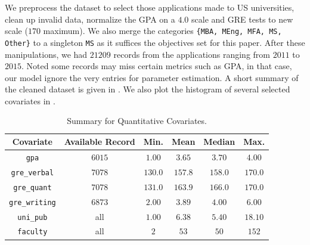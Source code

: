 \documentclass{article}
\newcommand{\var}[1]{\texttt{#1}}
\begin{document}
	We preprocess the dataset to select those applications made to US universities,
	clean up invalid data, normalize the GPA on a $4.0$ scale and GRE tests
	to new scale ($170$ maximum). We also merge the categories \var{\{MBA, MEng, MFA, MS, Other\}}
	to a singleton \var{MS} as it suffices the objectives set for this paper. After these manipulations,
	we had $21209$ records from the applications ranging from $2011$ to $2015$. Noted some records
	may miss certain metrics such as GPA, in that case, our model ignore the very entries for parameter
	estimation. A short summary of the cleaned dataset is given in . We also plot the histogram of several selected covariates in .

	\begin{table}[htpb]
	    \centering
	    \begin{tabular}{|c|c|c|c|c|c|}
		\hline
		Covariate & Available Record & Min. & Mean & Median & Max. \\\hline
		\var{gpa} & $6015$ & $1.00$ & $3.65$ & $3.70$ & $4.00$ \\\hline
		\var{gre\_verbal} & $7078$ & $130.0$ & $157.8$ & $158.0$ & $170.0$ \\\hline
		\var{gre\_quant} & $7078$ & $131.0$ & $163.9$ & $166.0$ & $170.0$ \\\hline
		\var{gre\_writing} & $6873$ & $2.00$ & $3.89$ & $4.00$ & $6.00$ \\\hline
		\var{uni\_pub} & all & $1.00$ & $6.38$ & $5.40$ & $18.10$ \\\hline
		\var{faculty} & all & $2$ & $53$ & $50$ & $152$ \\\hline
	    \end{tabular}
	    \caption{Summary for Quantitative Covariates.}
	    \label{table:data_summary:quant}
	\end{table}
\end{document}

